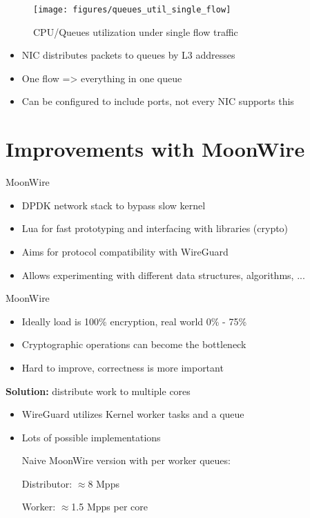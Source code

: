 \documentclass[NET,english]{tumbeamer}
\begin{document}
\begin{frame}
\begin{figure}
	\texttt{[image: figures/queues\_util\_single\_flow]}

	\caption{CPU/Queues utilization under single flow traffic}
	\label{fig:queuesutilsingleflow}
\end{figure}

\vspace*{-1em}
\begin{itemize}
	\item NIC distributes packets to queues by L3 addresses
	\item One flow => everything in one queue
	\item Can be configured to include ports, not every NIC supports this
\end{itemize}
\end{frame}

\section{Improvements with MoonWire}
\begin{frame}{MoonWire}
	\begin{itemize}
		\item DPDK network stack to bypass slow kernel
		\item Lua for fast prototyping and interfacing with libraries (crypto)
		\item Aims for protocol compatibility with WireGuard
		\item Allows experimenting with different data structures, algorithms, ...
	\end{itemize}
\end{frame}

\begin{frame}{MoonWire}

	\begin{itemize}
		\item Ideally load is 100\% encryption, real world 0\% - 75\%
		\item Cryptographic operations can become the bottleneck
		\item Hard to improve, correctness is more important
	\end{itemize}
	
	\textbf{Solution:} distribute work to multiple cores
	\begin{itemize}
		\item WireGuard utilizes Kernel worker tasks and a queue		
		\item Lots of possible implementations
		
		Naive MoonWire version with per worker queues:
		
		 Distributor: $\approx$8 Mpps
		 
		 Worker: $\approx$1.5 Mpps per core
	\end{itemize}
	
\end{frame}
\end{document}
